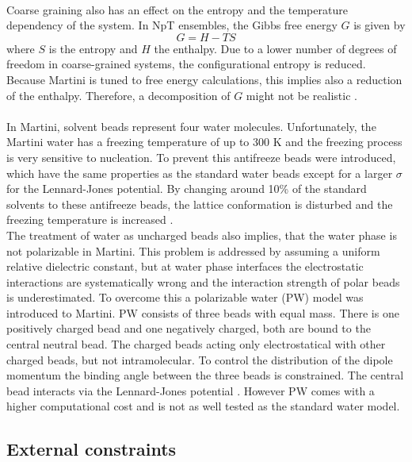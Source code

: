 \\
Coarse graining also has an effect on the entropy and the temperature dependency of the system. In NpT ensembles, the Gibbs free energy $G$ is given by
\begin{equation}
G = H - T S
\end{equation}
where $S$ is the entropy and $H$ the enthalpy. Due to a lower number of degrees of freedom in coarse-grained systems, the configurational entropy is reduced. Because Martini is tuned to free energy calculations, this implies also a reduction of the enthalpy. Therefore, a decomposition of $G$ might not be realistic \autocite[p. 6811]{martini22_check}.\\
\\
In Martini, solvent beads represent four water molecules. Unfortunately, the Martini water has a freezing temperature of up to 300 $\si{\kelvin}$ and the freezing process is very sensitive to nucleation. To prevent this antifreeze beads were introduced, which have the same properties as the standard water beads except for a larger $\sigma$ for the Lennard-Jones potential. By changing around 10\% of the standard solvents to these antifreeze beads, the lattice conformation is disturbed and the freezing temperature is increased \autocite[p. 7815]{martini}.\\
The treatment of water as uncharged beads also implies, that the water phase is not polarizable in Martini. This problem is addressed by assuming a uniform relative dielectric constant, but at water phase interfaces the electrostatic interactions are systematically wrong and the interaction strength of polar beads is underestimated. To overcome this a polarizable water (PW) model was introduced to Martini. PW consists of three beads with equal mass. There is one positively charged bead and one negatively charged, both are bound to the central neutral bead. The charged beads acting only electrostatical with other charged beads, but not intramolecular. To control the distribution of the dipole momentum the binding angle between the three beads is constrained. The central bead interacts via the Lennard-Jones potential \autocite{polarizableMartini}. However PW comes with a higher computational cost and is not as well tested as the standard water model.
\subsection{External constraints}

